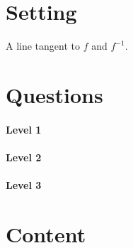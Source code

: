 \documentclass{ximera}
\begin{document}
\section{Setting}

\vfil

A line tangent to $f$ and $f^{-1}$.

\vfil

\vfil

\newpage


\section{Questions}

\paragraph{Level 1}

\paragraph{Level 2}

\paragraph{Level 3}


\section{Content}
\end{document}
